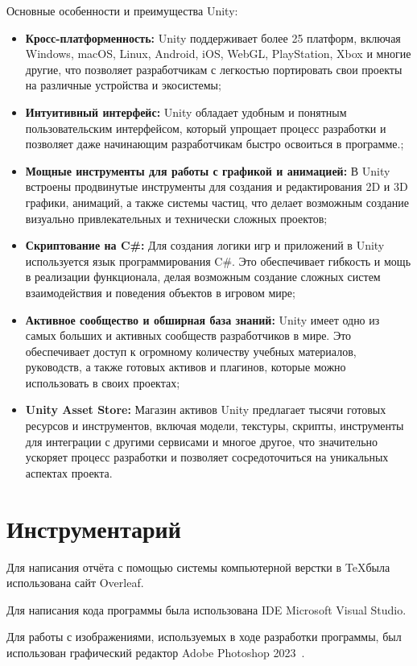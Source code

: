 Основные особенности и преимущества Unity:
\begin{itemize}
    \item \textbf{Кросс-платформенность:} Unity поддерживает более 25 платформ, включая Windows, macOS, Linux, Android, iOS, WebGL, PlayStation, Xbox и многие другие, что позволяет разработчикам с легкостью портировать свои проекты на различные устройства и экосистемы;
    \item \textbf{Интуитивный интерфейс:} Unity обладает удобным и понятным пользовательским интерфейсом, который упрощает процесс разработки и позволяет даже начинающим разработчикам быстро освоиться в программе.;
    \item \textbf{Мощные инструменты для работы с графикой и анимацией:} В Unity встроены продвинутые инструменты для создания и редактирования 2D и 3D графики, анимаций, а также системы частиц, что делает возможным создание визуально привлекательных и технически сложных проектов;
    \item \textbf{Скриптование на C\#:} Для создания логики игр и приложений в Unity используется язык программирования C\#. Это обеспечивает гибкость и мощь в реализации функционала, делая возможным создание сложных систем взаимодействия и поведения объектов в игровом мире;
    \item \textbf{Активное сообщество и обширная база знаний:} Unity имеет одно из самых больших и активных сообществ разработчиков в мире. Это обеспечивает доступ к огромному количеству учебных материалов, руководств, а также готовых активов и плагинов, которые можно использовать в своих проектах;
    \item \textbf{Unity Asset Store:} Магазин активов Unity предлагает тысячи готовых ресурсов и инструментов, включая модели, текстуры, скрипты, инструменты для интеграции с другими сервисами и многое другое, что значительно ускоряет процесс разработки и позволяет сосредоточиться на уникальных аспектах проекта.
\end{itemize}


\section{\label{sec:ch01/sec03}Инструментарий}
Для написания отчёта с помощью системы компьютерной верстки в \TeX была использована сайт Overleaf.

Для написания кода программы была использована IDE Microsoft Visual Studio.

Для работы с изображениями, используемых в ходе разработки программы, был использован графический редактор Adobe Photoshop 2023~\cite{photoshop}.

